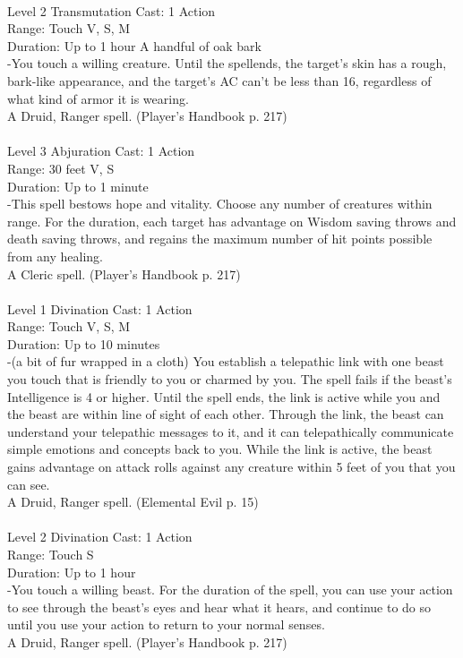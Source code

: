 \documentclass[10pt,twocolumn]{report}
\begin{document}
 \\
Level 2 \quad Transmutation \quad Cast: 1 Action\\
Range: Touch \quad V, S, M\\
Duration: Up to 1 hour \quad A handful of oak bark\\
-You touch a willing creature. Until the spellends, the target’s skin has a rough, bark-like appearance, and the target’s AC can’t be less than 16, regardless of what kind of armor it is wearing.\\
A Druid, Ranger spell. (Player's Handbook p. 217) \\


 \\
Level 3 \quad Abjuration \quad Cast: 1 Action\\
Range: 30 feet \quad V, S\\
Duration: Up to 1 minute \quad \\
-This spell bestows hope and vitality. Choose any number of creatures within range. For the duration, each target has advantage on Wisdom saving throws and death saving throws, and regains the maximum number of hit points possible from any healing.\\
A Cleric spell. (Player's Handbook p. 217) \\


 \\
Level 1 \quad Divination \quad Cast: 1 Action\\
Range: Touch \quad V, S, M\\
Duration: Up to 10 minutes \quad \\
-(a bit of fur wrapped in a cloth)
You establish a telepathic link with one beast you touch that is friendly to you or charmed by you. The spell
fails if the beast’s Intelligence is 4 or higher. Until the spell ends, the link is active while you and the beast are within line of sight of each other. Through the link, the beast can understand your telepathic messages to it, and it can telepathically communicate simple emotions and concepts back to you. While the link is active,
the beast gains advantage on attack rolls against any creature within 5 feet of you that you can see.\\
A Druid, Ranger spell. (Elemental Evil p. 15) \\


 \\
Level 2 \quad Divination \quad Cast: 1 Action\\
Range: Touch \quad S\\
Duration: Up to 1 hour \quad \\
-You touch a willing beast. For the duration of the spell, you can use your action to see through the beast’s eyes and hear what it hears, and continue to do so until you use your action to return to your normal senses.\\
A Druid, Ranger spell. (Player's Handbook p. 217) \\
\end{document}
